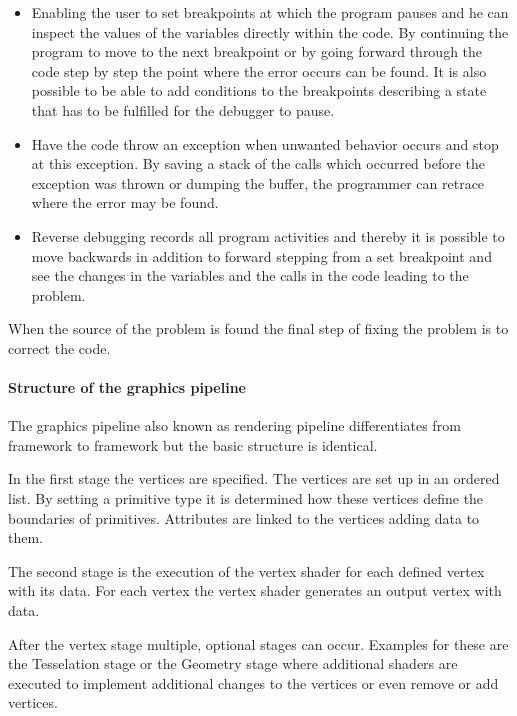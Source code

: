 \begin{itemize}

\item Enabling the user to set breakpoints at which the program pauses and he can inspect the values of the variables directly within the code. By continuing the program to move to the next breakpoint or by going forward through the code step by step the point where the error occurs can be found. It is also possible to be able to add conditions to the breakpoints describing a state that has to be fulfilled for the debugger to pause. 


\item Have the code throw an exception when unwanted behavior occurs and stop at this exception. By saving a stack of the calls which occurred before the exception was thrown or dumping the buffer, the programmer can retrace where the error may be found.


\item Reverse debugging records all program activities and thereby it is possible to move backwards in addition to forward stepping from a set breakpoint and see the changes in the variables and the calls in the code leading to the problem.

\end{itemize}

When the source of the problem is found the final step of fixing the problem is to correct the code.

\paragraph{Structure of the graphics pipeline}
\label{paragraph:pipeline}

The graphics pipeline also known as rendering pipeline differentiates from framework to framework but the basic structure is identical. 

In the first stage the vertices are specified. The vertices are set up in an ordered list. By setting a primitive type it is determined how these vertices define the boundaries of primitives. Attributes are linked to the vertices adding data to them.

The second stage is the execution of the vertex shader for each defined vertex with its data. For each vertex the vertex shader generates an output vertex with data.

After the vertex stage multiple, optional stages can occur. Examples for these are the Tesselation stage or the Geometry stage where additional shaders are executed to implement additional changes to the vertices or even remove or add vertices.

